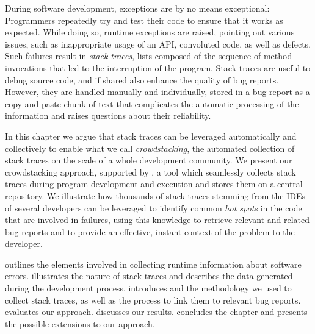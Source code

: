 




During software development, exceptions are by no means exceptional: Programmers repeatedly try and test their code to ensure that it works as expected.
While doing so, runtime exceptions are raised, pointing out various issues, such as inappropriate usage of an API, convoluted code, as well as defects.
Such failures result in \emph{stack traces}, lists composed of the sequence of method invocations that led to the interruption of the program.
Stack traces are useful to debug source code, and if shared also enhance the quality of bug reports.
However, they are handled manually and individually, stored in a bug report as a copy-and-paste chunk of text that complicates the automatic processing of the information and raises questions about their reliability.

In this chapter we argue that stack traces can be leveraged automatically and collectively to enable what we call \emph{crowdstacking}, the automated collection of stack traces on the scale of a whole development community.
We present our crowdstacking approach, supported by \slr, a tool which seamlessly collects stack traces during program development and execution and stores them on a central repository.
We illustrate how thousands of stack traces stemming from the IDEs of several developers can be leveraged to identify common \emph{hot spots} in the code that are involved in failures, using this knowledge to retrieve relevant and related bug reports and to provide an effective, instant context of the problem to the developer.

\structure

 outlines the elements involved in collecting runtime information about software errors.
 illustrates the nature of stack traces and describes the data generated during the development process.
 introduces \slr and the methodology we used to collect stack traces, as well as the process to link them to relevant bug reports.
 evaluates our approach.
 discusses our results.
 concludes the chapter and presents the possible extensions to our approach.

